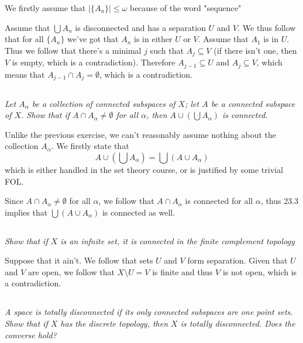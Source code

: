 \documentclass[11pt,oneside,titlepage]{book}
\newcommand{\set}[1]{\{ #1 \}}
\begin{document}
We firstly assume that $|\set{A_n}| \leq \omega$ because of the word "sequence"

Assume that $\bigcup{A_n}$ is disconnected and has a separation $U$ and $V$.
We thus follow that for all $\set{A_n}$ we've got that $A_n$ is in either $U$ or $V$.
Assume that $A_1$ is in $U$. Thus we follow that there's a minimal $j$ such
that $A_j \subseteq V$ (if there isn't one, then $V$ is empty, which is a contradiction).
Therefore $A_{j - 1} \subseteq U$ and $A_j \subseteq V$, which means that
$A_{j - 1} \cap A_{j} = \emptyset$, which is a contradiction.

\subsection{}

\textit{Let $A_\alpha$ be a collection of connected subspaces of $X$; let $A$
  be a connected subspace of $X$. Show that if $A \cap A_\alpha \neq \emptyset$ for all $\alpha$,
  then $A \cup (\bigcup{A_\alpha})$ is connected.}

Unlike the previous exercise, we can't reasonably assume nothing about the collection $A_\alpha$.
We firstly state that
$$A \cup (\bigcup{A_\alpha}) = \bigcup{(A \cup A_\alpha)}$$
which is either handled in the set theory course, or is justified by some trivial FOL.

Since $A \cap A_\alpha \neq \emptyset$ for all $\alpha$, we follow that $A \cap A_\alpha$
is connected for all $\alpha$, thus 23.3 implies that $\bigcup{(A \cup A_\alpha)}$ is connected as
well.

\subsection{}

\textit{Show that if $X$ is an infnite set, it is connected in the finite complement topology}

Suppose that it ain't. We follow that sets $U$ and $V$ form separation. Given that
$U$ and $V$ are open, we follow that 
$X \setminus U = V$ is finite and thus $V$ is not open, which is a contradiction.

\subsection{}

\textit{A space is totally disconnected if its only connected subspaces are one point sets.
  Show that if $X$ has the discrete topology, then $X$ is totally disconnected. Does the
  converse hold?}
\end{document}
